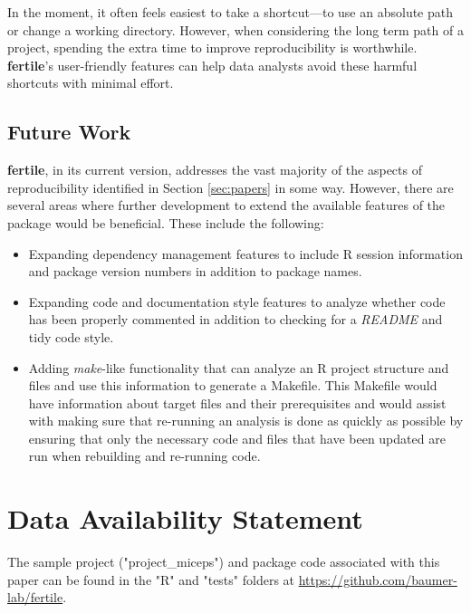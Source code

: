 \documentclass[APA,LATO1COL]{WileyNJD-v2}\usepackage[]{graphicx}\usepackage[]{color}
\newcommand{\R}{\textsf{R}\xspace}
\newcommand{\cmd}[1]{\textit{#1}}
\newcommand{\pkg}[1]{\textbf{#1}}
\begin{document}
In the moment, it often feels easiest to take a shortcut---to use an absolute path or change a working directory. However, when considering the long term path of a project, spending the extra time to improve reproducibility is worthwhile. \pkg{fertile}'s user-friendly features can help data analysts avoid these harmful shortcuts with minimal effort.

\subsection{Future Work}\label{sec:future}

\pkg{fertile}, in its current version, addresses the vast majority of the aspects of reproducibility identified in Section \ref{sec:papers} in some way. However, there are several areas where further development to extend the available features of the package would be beneficial. These include the following:

\begin{itemize} [noitemsep]
  \item Expanding dependency management features to include \R session information and package version numbers in addition to package names.
  \item Expanding code and documentation style features to analyze whether code has been properly commented in addition to checking for a \cmd{README} and tidy code style.
  \item Adding \cmd{make}-like functionality that can analyze an \R project structure and files and use this information to generate a Makefile. This Makefile would have information about target files and their prerequisites and would assist with making sure that re-running an analysis is done as quickly as possible by ensuring that only the necessary code and files that have been updated are run when rebuilding and re-running code.
\end{itemize}


\section*{Data Availability Statement}
The sample project ("project\_miceps") and package code associated with this paper can be found in the "R" and "tests" folders at \href{https://github.com/baumer-lab/fertile}{https://github.com/baumer-lab/fertile}.

\nocite{*}%
%
\end{document}

